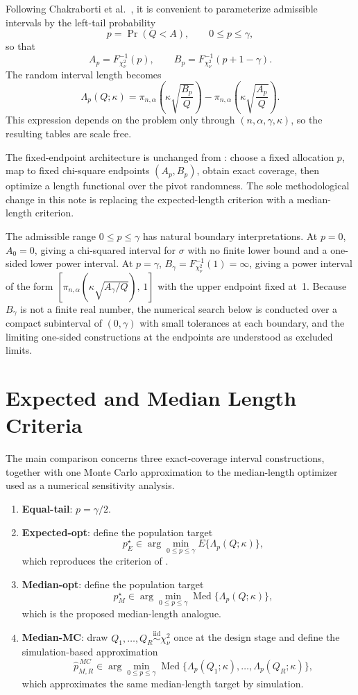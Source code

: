 \documentclass[11pt]{article}
\begin{document}
\noindent Following Chakraborti et al.\ \citep{chakraborti2012shortest}, it is convenient to parameterize admissible intervals by the left-tail probability
\[
p=\Pr(Q<A), \qquad 0\le p\le \gamma,
\]
so that
\[
A_p = F_{\chi^2_\nu}^{-1}(p),
\qquad
B_p = F_{\chi^2_\nu}^{-1}(p+1-\gamma).
\]
The random interval length becomes
\[
\Lambda_p(Q;\kappa)
=
\pi_{n,\alpha}\!\left(\kappa\sqrt{\frac{B_p}{Q}}\right)
-
\pi_{n,\alpha}\!\left(\kappa\sqrt{\frac{A_p}{Q}}\right).
\]
This expression depends on the problem only through $(n,\alpha,\gamma,\kappa)$, so the resulting tables are scale free.

The fixed-endpoint architecture is unchanged from \citet{chakraborti2012shortest}: choose a fixed allocation $p$, map to fixed chi-square endpoints $(A_p,B_p)$, obtain exact coverage, then optimize a length functional over the pivot randomness. The sole methodological change in this note is replacing the expected-length criterion with a median-length criterion.

The admissible range $0\le p\le\gamma$ has natural boundary interpretations. At $p=0$, $A_0=0$, giving a chi-squared interval for $\sigma$ with no finite lower bound and a one-sided lower power interval. At $p=\gamma$, $B_\gamma = F_{\chi^2_\nu}^{-1}(1)=\infty$, giving a power interval of the form $[\pi_{n,\alpha}(\kappa\sqrt{A_\gamma/Q}),\,1]$ with the upper endpoint fixed at~1. Because $B_\gamma$ is not a finite real number, the numerical search below is conducted over a compact subinterval of $(0,\gamma)$ with small tolerances at each boundary, and the limiting one-sided constructions at the endpoints are understood as excluded limits.

\section{Expected and Median Length Criteria}
The main comparison concerns three exact-coverage interval constructions, together with one Monte Carlo approximation to the median-length optimizer used as a numerical sensitivity analysis.

\begin{enumerate}
\item \textbf{Equal-tail}: $p=\gamma/2$.
\item \textbf{Expected-opt}: define the population target
\[
\quad
p_E^\star \in \arg\min_{0\le p\le \gamma} E\{\Lambda_p(Q;\kappa)\},
\]
which reproduces the criterion of \citet{chakraborti2012shortest}.
\item \textbf{Median-opt}: define the population target
\[
\quad
p_M^\star \in \arg\min_{0\le p\le \gamma} \operatorname{Med}\{\Lambda_p(Q;\kappa)\},
\]
which is the proposed median-length analogue.
\item \textbf{Median-MC}: draw $Q_1,\dots,Q_R \stackrel{\mathrm{iid}}{\sim}\chi^2_\nu$ once at the design stage and define the simulation-based approximation
\[
\quad
\widehat p_{M,R}^{\,MC} \in \arg\min_{0\le p\le \gamma} \operatorname{Med}\{\Lambda_p(Q_1;\kappa),\dots,\Lambda_p(Q_R;\kappa)\},
\]
which approximates the same median-length target by simulation.
\end{enumerate}
\end{document}
